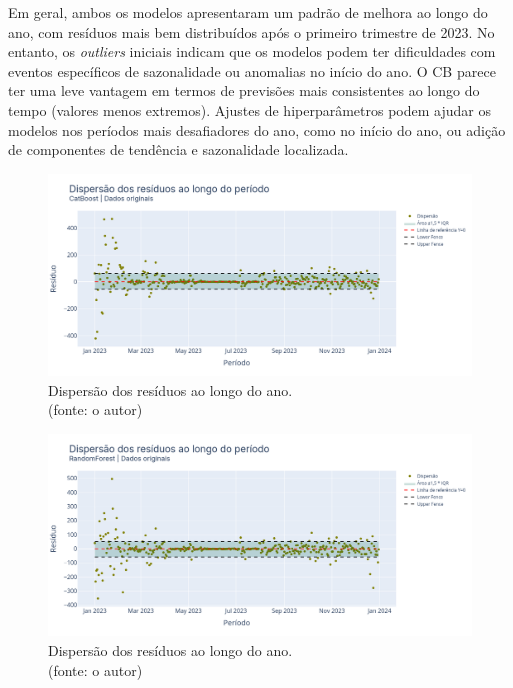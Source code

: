 Em geral, ambos os modelos apresentaram um padrão de melhora ao longo do ano, com resíduos mais bem distribuídos após o primeiro trimestre de 2023. No entanto, os \textit{outliers} iniciais indicam que os modelos podem ter dificuldades com eventos específicos de sazonalidade ou anomalias no início do ano. O CB parece ter uma leve vantagem em termos de previsões mais consistentes ao longo do tempo (valores menos extremos). Ajustes de hiperparâmetros podem ajudar os modelos nos períodos mais desafiadores do ano, como no início do ano, ou adição de componentes de tendência e sazonalidade localizada.

\begin{figure}[!h]
\centering
\includegraphics[scale=0.33]{Figuras/jequiti/resultados/CB_WFV_ORIG_RESID_x_TEMPO.png}
\caption{Dispersão dos resíduos ao longo do ano.\\(fonte: o autor)}
\label{fig:jequiti_CB_WFV_ORIG_RESID_x_TEMPO}
\end{figure}

\begin{figure}[!h]
\centering
\includegraphics[scale=0.33]{Figuras/jequiti/resultados/RF_WFV_ORIG_RESID_x_TEMPO.png}
\caption{Dispersão dos resíduos ao longo do ano.\\(fonte: o autor)}
\label{fig:jequiti_RF_WFV_ORIG_RESID_x_TEMPO}
\end{figure}
\clearpage

